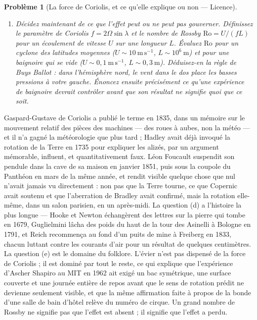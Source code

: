 \documentclass[11pt]{article}
\newtheorem{problem}{Problème}
\begin{document}
\begin{problem}[{La force de Coriolis, et ce qu'elle explique ou non --- Licence}]
\begin{enumerate}
et évaluez cela pour $ h = 100\ \mathrm{m} $ à $ \lambda = 45^{\circ} $. Expliquez en termes
physiques --- le moment cinétique par rapport à l'axe terrestre y suffira --- pourquoi la déviation
se fait vers l'est et non vers l'ouest, et pourquoi le résultat est si petit que les tentatives
des dix-septième et dix-huitième siècles pour le mesurer ont surtout mesuré des courants
d'air.
\item[(e)] Décidez maintenant de ce que l'effet peut ou ne peut pas gouverner. Définissez le paramètre
de Coriolis $ f = 2\Omega\sin\lambda $ et le nombre de Rossby $ \mathrm{Ro} = U/(fL) $ pour
un écoulement de vitesse $ U $ sur une longueur $ L $. Évaluez $ \mathrm{Ro} $ pour un
cyclone des latitudes moyennes ($ U \sim 10\ \mathrm{m\,s^{-1}} $,
$ L \sim 10^{6}\ \mathrm{m} $) et pour une baignoire qui se vide
($ U \sim 0{,}1\ \mathrm{m\,s^{-1}} $, $ L \sim 0{,}3\ \mathrm{m} $). Déduisez-en la règle de
Buys Ballot : dans l'hémisphère nord, le vent dans le dos place les basses pressions à votre
gauche. Énoncez ensuite précisément ce qu'une expérience de baignoire devrait contrôler avant que
son résultat ne signifie quoi que ce soit.
\end{enumerate}

\end{problem}

\noindent Gaspard-Gustave de Coriolis a publié le terme en 1835, dans un mémoire sur le
mouvement relatif des pièces des machines --- des roues à aubes, non la météo --- et il n'a gagné la
météorologie que plus tard ; Hadley avait déjà invoqué la rotation de la Terre en 1735 pour
expliquer les alizés, par un argument mémorable, influent, et quantitativement faux. Léon Foucault
suspendit son pendule dans la cave de sa maison en janvier 1851, puis sous la coupole du Panthéon
en mars de la même année, et rendit visible quelque chose que nul n'avait jamais vu directement :
non pas que la Terre tourne, ce que Copernic avait soutenu et que l'aberration de Bradley avait
confirmé, mais la rotation elle-même, dans un salon parisien, en un après-midi. La question (d) a
l'histoire la plus longue --- Hooke et Newton échangèrent des lettres sur la pierre qui tombe en
1679, Guglielmini lâcha des poids du haut de la tour des Asinelli à Bologne en 1791, et Reich
recommença au fond d'un puits de mine à Freiberg en 1833, chacun luttant contre les courants d'air
pour un résultat de quelques centimètres. La question (e) est le domaine du folklore. L'évier
n'est pas dispensé de la force de Coriolis ; il est dominé par tout le reste, ce qui explique que
l'expérience d'Ascher Shapiro au MIT en 1962 ait exigé un bac symétrique, une surface couverte et
une journée entière de repos avant que le sens de rotation prédit ne devienne seulement visible,
et que la même affirmation faite à propos de la bonde d'une salle de bain d'hôtel relève du
numéro de cirque. Un grand nombre de Rossby ne signifie pas que l'effet est absent ; il signifie
que l'effet a perdu.
\end{document}
